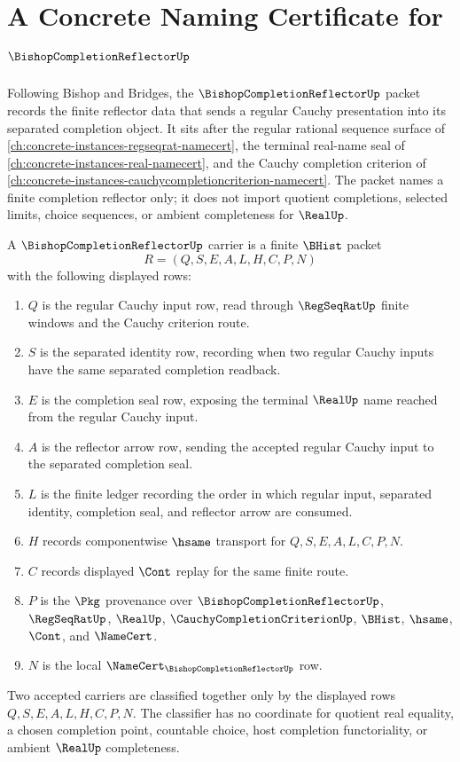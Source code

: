 \chapter{A Concrete Naming Certificate for $\BishopCompletionReflectorUp$}
\label{ch:concrete-instances-bishop-completion-reflector-namecert}

Following Bishop and Bridges, the $\BishopCompletionReflectorUp$ packet records the finite reflector data that sends a regular Cauchy presentation into its separated completion object. It sits after the regular rational sequence surface of \autoref{ch:concrete-instances-regseqrat-namecert}, the terminal real-name seal of \autoref{ch:concrete-instances-real-namecert}, and the Cauchy completion criterion of \autoref{ch:concrete-instances-cauchycompletioncriterion-namecert}. The packet names a finite completion reflector only; it does not import quotient completions, selected limits, choice sequences, or ambient completeness for $\RealUp$.

\begin{definition}\label{def:bishop-completion-reflector-carrier}
A $\BishopCompletionReflectorUp$ carrier is a finite $\BHist$ packet
$$
R=(Q,S,E,A,L,H,C,P,N)
$$
with the following displayed rows:
\begin{enumerate}
\item $Q$ is the regular Cauchy input row, read through $\RegSeqRatUp$ finite windows and the Cauchy criterion route.
\item $S$ is the separated identity row, recording when two regular Cauchy inputs have the same separated completion readback.
\item $E$ is the completion seal row, exposing the terminal $\RealUp$ name reached from the regular Cauchy input.
\item $A$ is the reflector arrow row, sending the accepted regular Cauchy input to the separated completion seal.
\item $L$ is the finite ledger recording the order in which regular input, separated identity, completion seal, and reflector arrow are consumed.
\item $H$ records componentwise $\hsame$ transport for $Q,S,E,A,L,C,P,N$.
\item $C$ records displayed $\Cont$ replay for the same finite route.
\item $P$ is the $\Pkg$ provenance over $\BishopCompletionReflectorUp$, $\RegSeqRatUp$, $\RealUp$, $\CauchyCompletionCriterionUp$, $\BHist$, $\hsame$, $\Cont$, and $\NameCert$.
\item $N$ is the local $\NameCert_{\BishopCompletionReflectorUp}$ row.
\end{enumerate}
Two accepted carriers are classified together only by the displayed rows $Q,S,E,A,L,H,C,P,N$. The classifier has no coordinate for quotient real equality, a chosen completion point, countable choice, host completion functoriality, or ambient $\RealUp$ completeness.
\end{definition}

